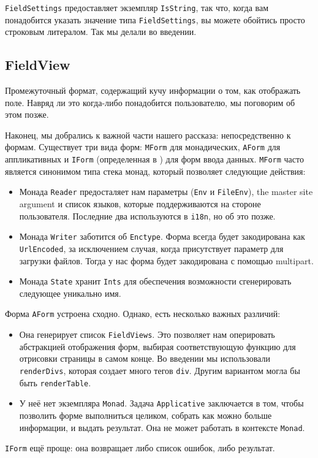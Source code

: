 \begin{remark}
\lstinline'FieldSettings' предоставляет экземпляр \lstinline'IsString', так что, 
когда вам понадобится указать значение типа \lstinline'FieldSettings', вы можете 
обойтись просто строковым литералом. Так мы делали во введении.
\end{remark}

\subsection{FieldView}
Промежуточный формат, содержащий кучу информации о том, как отображать поле. 
Навряд ли это когда-либо понадобится пользователю, мы поговорим об этом позже.

Наконец, мы добрались к важной части нашего рассказа: непосредственно к формам. Существует
три вида форм: \lstinline'MForm' для монадических, \lstinline'AForm' для аппликативных и
\lstinline'IForm' (определенная в 
) 
для форм ввода данных. \lstinline'MForm' часто является синонимом типа стека 
монад, который позволяет следующие действия:

\begin{itemize}
\item Монада \lstinline'Reader' предосталяет нам параметры (\lstinline'Env' и 
\lstinline'FileEnv'), the master site argument и список языков, 
которые поддерживаются на
стороне пользователя. Последние два используются в \lstinline'i18n', но об это позже.

\item Монада \lstinline'Writer' заботится об \lstinline'Enctype'. Форма всегда будет 
закодирована как  \lstinline'UrlEncoded', за исключением случая, когда присутствует
параметр для загрузки файлов. Тогда у нас форма будет закодирована с помощью multipart.
\item Монада \lstinline'State' хранит \lstinline'Ints' для обеспечения возможности
сгенерировать следующее уникально имя.
\end{itemize}
Форма \lstinline'AForm' устроена сходно. Однако, есть несколько важных различий:
\begin{itemize}
\item Она генерирует список \lstinline'FieldViews'. Это позволяет нам оперировать
абстракцией отображения форм, выбирая соответствующую функцию для отрисовки страницы в
самом конце. Во введении мы использовали \lstinline'renderDivs', которая создает
много тегов \lstinline'div'. Другим вариантом могла бы быть 
\lstinline'renderTable'.

\item У неё нет экземпляра \lstinline'Monad'. Задача \lstinline'Applicative' заключается
в том, чтобы позволить форме выполниться целиком, собрать как можно больше информации, и
выдать результат. Она не может работать в контексте \lstinline'Monad'.
\end{itemize}
\lstinline'IForm' ещё проще: она возвращает либо список ошибок, либо результат.

